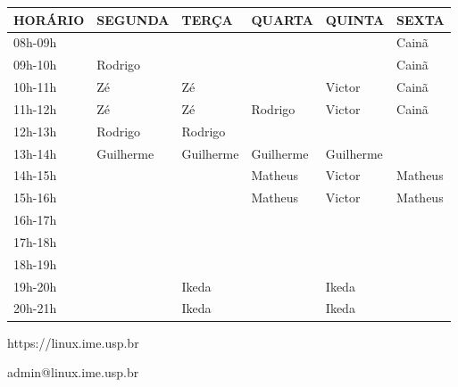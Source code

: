 \documentclass[12pt]{article}
\newcommand{\cai}{Cainã}
\newcommand{\gui}{Guilherme}
\newcommand{\ike}{Ikeda}
\newcommand{\mat}{Matheus}
\newcommand{\rod}{Rodrigo}
\newcommand{\vic}{Victor}
\newcommand{\zee}{Zé}
\newcommand{\tnhl}{\tabularnewline\hline}
\begin{document}
\begin{center}
  \Large
  \begin{tabular}{ |x{3.5cm}|x{3.5cm}|x{3.5cm}|x{3.5cm}|x{3.5cm}|x{3.5cm}| }
    \hline
    \textbf{HORÁRIO} & \textbf{SEGUNDA} & \textbf{TERÇA} & \textbf{QUARTA} & \textbf{QUINTA} & \textbf{SEXTA} \tnhl
    08h-09h          & {}               & {}             & {}              & {}              & \cai           \tnhl
    09h-10h          & \rod             & {}             & {}              & {}              & \cai           \tnhl
    10h-11h          & \zee             & \zee           & {}              & \vic            & \cai           \tnhl
    11h-12h          & \zee             & \zee           & \rod            & \vic            & \cai           \tnhl
    12h-13h          & \rod             & \rod           & {}              & {}              & {}             \tnhl
    13h-14h          & \gui             & \gui           & \gui            & \gui            & {}             \tnhl
    14h-15h          & {}               & {}             & \mat            & \vic            & \mat           \tnhl
    15h-16h          & {}               & {}             & \mat            & \vic            & \mat           \tnhl
    16h-17h          & {}               & {}             & {}              & {}              & {}             \tnhl
    17h-18h          & {}               & {}             & {}              & {}              & {}             \tnhl
    18h-19h          & {}               & {}             & {}              & {}              & {}             \tnhl
    19h-20h          & {}               & \ike           & {}              & \ike            & {}             \tnhl
    20h-21h          & {}               & \ike           & {}              & \ike            & {}             \tnhl
  \end{tabular}

  \vspace{1.5cm}
  {\selectfont
    \normalsize
    https://linux.ime.usp.br
    
    admin@linux.ime.usp.br
  }
\end{center}
\end{document}

